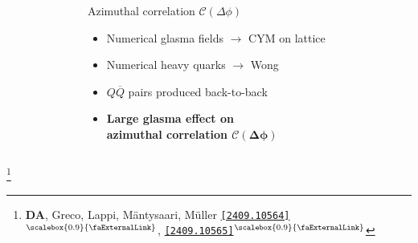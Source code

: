 \documentclass[aspectratio=169,11pt,usenames,dvipsnames]{beamer}
\renewcommand{\thefootnote}{\color{customblue}\faPaperPlaneO}
\newcommand\blfootnote[1]{%
  \begingroup
  \renewcommand\thefootnote{}\footnote{#1}%
  \addtocounter{footnote}{-1}%
  \endgroup
}
\begin{document}
\begin{frame}[t,noframenumbering]
\begin{columns}[onlytextwidth,t]
\begin{figure}
        \end{figure}
        \begin{center}
            {\Large\color{isgold} Azimuthal correlation $\mathcal{C}(\Delta\phi)$\\[10pt]}
            \footnotesize
                \begin{itemize}
                    \item {\color{lightgray}Numerical glasma fields $\rightarrow$ CYM on lattice}
                    \item {\color{lightgray}Numerical heavy quarks $\rightarrow$ Wong}
                    \item {\color{lightgray}$Q\overline{Q}$ pairs produced back-to-back}\\[15pt]
                    \item {\color{destacado}\bfseries\normalsize{Large glasma effect on\\ azimuthal correlation $\boldsymbol{\mathcal{C}(\Delta\phi)}$}}
                \end{itemize}
        \end{center}
    \end{columns}
    \vspace{-5pt}
    \blfootnote{\scriptsize \textbf{DA}, Greco, Lappi, Mäntysaari, M\"{u}ller \href{https://arxiv.org/abs/2409.10564}{\color{palgold}\texttt{[2409.10564]}$^\text{\scalebox{0.9}{\faExternalLink}}$}, \href{https://arxiv.org/abs/2409.10565}{\color{palgold}\texttt{[2409.10565]}$^\text{\scalebox{0.9}{\faExternalLink}}$}}
\end{frame}

\end{document}
